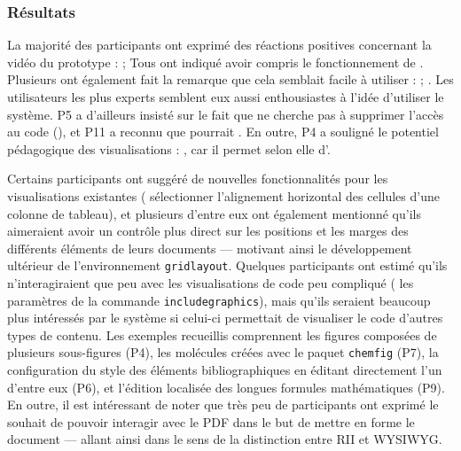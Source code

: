 \subsubsection{Résultats}
La majorité des participants ont exprimé des réactions positives concernant la vidéo du prototype :  ; 
Tous ont indiqué avoir compris le fonctionnement de \iLaTeX{}.
Plusieurs ont également fait la remarque que cela semblait facile à utiliser :  ; .
Les utilisateurs les plus experts semblent eux aussi enthousiastes à l'idée d'utiliser le système.
P5 a d'ailleurs insisté sur le fait que \iLaTeX{} ne cherche pas à supprimer l'accès au code (), et P11 a reconnu que \iLaTeX{} pourrait .
En outre, P4 a souligné le potentiel pédagogique des visualisations : , car il permet selon elle d'.

Certains participants ont suggéré de nouvelles fonctionnalités pour les visualisations existantes (\eg{} sélectionner l'alignement horizontal des cellules d'une colonne de tableau), et plusieurs d'entre eux ont également mentionné qu'ils aimeraient avoir un contrôle plus direct sur les positions et les marges des différents éléments de leurs documents --- motivant ainsi le développement ultérieur de l'environnement \texttt{gridlayout}.
Quelques participants ont estimé qu'ils n'interagiraient que peu avec les visualisations de code peu compliqué (\eg{} les paramètres de la commande \texttt{includegraphics}), mais qu'ils seraient beaucoup plus intéressés par le système si celui-ci permettait de visualiser le code d'autres types de contenu.
Les exemples recueillis comprennent les figures composées de plusieurs sous-figures (P4), les molécules créées avec le paquet \texttt{chemfig} (P7), la configuration du style des éléments bibliographiques en éditant directement l'un d'entre eux (P6), et l'édition localisée des longues formules mathématiques (P9).
En outre, il est intéressant de noter que très peu de participants ont exprimé le souhait de pouvoir interagir avec le PDF dans le but de mettre en forme le document --- allant ainsi dans le sens de la distinction entre RII et WYSIWYG.



